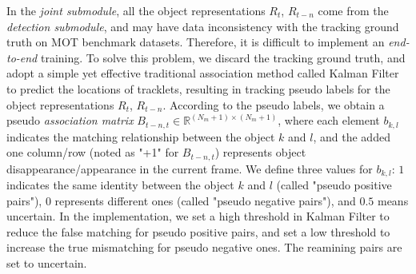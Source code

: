 \documentclass[acmsmall]{acmart}
\begin{document}
{
In the \emph{joint submodule}, all the object representations $R_t$, $R_{t-n}$ come from the \emph{detection submodule}, and may have data inconsistency with the tracking ground truth on MOT benchmark datasets.
Therefore, it is difficult to implement an \emph{end-to-end} training. 
To solve this problem, we discard the tracking ground truth, and adopt a simple yet effective traditional association method called Kalman Filter~\cite{welch1995introduction} to predict the locations of tracklets, resulting in tracking pseudo labels for the object representations $R_t$, $R_{t-n}$.
According to the pseudo labels, we obtain a pseudo \emph{association matrix} $B_{t-n,t} \in \mathbb{R}^{(N_m+1) \times (N_m+1)}$, where each element $b_{k,l}$ indicates the matching relationship between the object $k$ and $l$, and the added one column/row (noted as "+1" for $B_{t-n,t}$) represents object disappearance/appearance in the current frame.
We define three values for $b_{k,l}$: $1$ indicates the same identity between the object $k$ and $l$ (called "pseudo positive pairs"), $0$ represents different ones (called "pseudo negative pairs"), and $0.5$ means uncertain.
In the implementation, we set a high threshold in Kalman Filter to reduce the false matching for pseudo positive pairs, and set a low threshold to increase the true mismatching for pseudo negative ones. The reamining pairs are set to uncertain.
}
\end{document}
